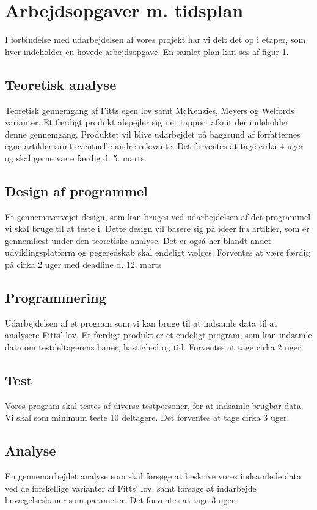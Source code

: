\documentclass{article}
\begin{document}
\section{Arbejdsopgaver m. tidsplan}
I forbindelse med udarbejdelsen af vores projekt har vi delt det op i etaper, som hver indeholder én hovede arbejdsopgave. En samlet plan kan ses af figur 1.

\subsection{Teoretisk analyse}
Teoretisk gennemgang af Fitts egen lov samt McKenzies, Meyers og Welfords varianter. Et færdigt produkt afspejler sig i et rapport afsnit der indeholder denne gennemgang. Produktet vil blive udarbejdet på baggrund af forfatternes egne artikler samt eventuelle andre relevante. Det forventes at tage cirka 4 uger og skal gerne være færdig d. 5. marts.

\subsection{Design af programmel}
Et gennemovervejet design, som kan bruges ved udarbejdelsen af det programmel vi skal bruge til at teste i. Dette design vil basere sig på ideer fra artikler, som er gennemlæst under den teoretiske analyse. Det er også her blandt andet udviklingsplatform og pegeredskab skal endeligt vælges. Forventes at være færdig på cirka 2 uger med deadline d. 12. marts

\subsection{Programmering}
Udarbejdelsen af et program som vi kan bruge til at indsamle data til at analysere Fitts' lov. Et færdigt produkt er et endeligt program, som kan indsamle data om testdeltagerens baner, hastighed og tid. Forventes at tage cirka 2 uger.

\subsection{Test}
Vores program skal testes af diverse testpersoner, for at indsamle brugbar data. Vi skal som minimum teste 10 deltagere. Det forventes at tage cirka 3 uger.

\subsection{Analyse}
En gennemarbejdet analyse som skal forsøge at beskrive vores indsamlede data ved de forskellige varianter af Fitts' lov, samt forsøge at indarbejde bevægelsesbaner som parameter. Det forventes at tage 3 uger.
\end{document}
